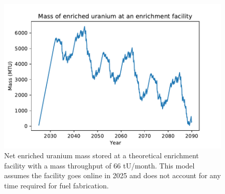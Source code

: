 \begin{figure}
    \centering
    \includegraphics[width=\textwidth]{../figures/potential_uranium_stockpile.pdf}
    \caption{Net enriched uranium mass stored at a theoretical enrichment facility with 
    a mass throughput of 66 tU/month. This model assumes the facility goes online in 2025
    and does not account for any time required for fuel fabrication.}
    \label{fig:enrich_storage}
\end{figure}
